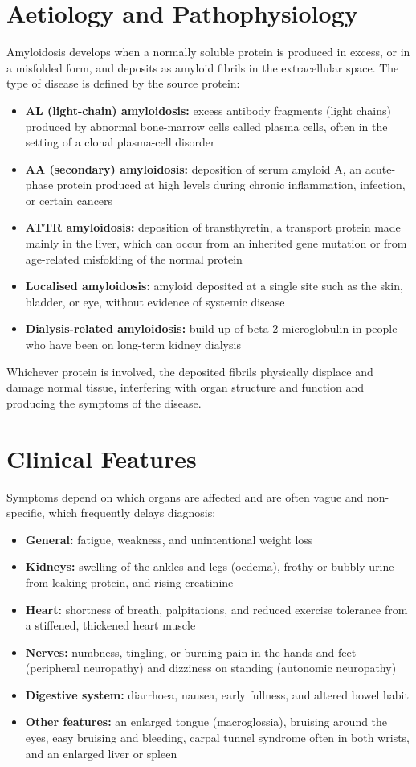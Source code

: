 \section*{Aetiology and Pathophysiology}
Amyloidosis develops when a normally soluble protein is produced in excess, or in a misfolded form, and deposits as amyloid fibrils in the extracellular space. The type of disease is defined by the source protein:
\begin{itemize}
    \item \textbf{AL (light-chain) amyloidosis:} excess antibody fragments (light chains) produced by abnormal bone-marrow cells called plasma cells, often in the setting of a clonal plasma-cell disorder
    \item \textbf{AA (secondary) amyloidosis:} deposition of serum amyloid A, an acute-phase protein produced at high levels during chronic inflammation, infection, or certain cancers
    \item \textbf{ATTR amyloidosis:} deposition of transthyretin, a transport protein made mainly in the liver, which can occur from an inherited gene mutation or from age-related misfolding of the normal protein
    \item \textbf{Localised amyloidosis:} amyloid deposited at a single site such as the skin, bladder, or eye, without evidence of systemic disease
    \item \textbf{Dialysis-related amyloidosis:} build-up of beta-2 microglobulin in people who have been on long-term kidney dialysis
\end{itemize}
Whichever protein is involved, the deposited fibrils physically displace and damage normal tissue, interfering with organ structure and function and producing the symptoms of the disease.

\section*{Clinical Features}
Symptoms depend on which organs are affected and are often vague and non-specific, which frequently delays diagnosis:
\begin{itemize}
    \item \textbf{General:} fatigue, weakness, and unintentional weight loss
    \item \textbf{Kidneys:} swelling of the ankles and legs (oedema), frothy or bubbly urine from leaking protein, and rising creatinine
    \item \textbf{Heart:} shortness of breath, palpitations, and reduced exercise tolerance from a stiffened, thickened heart muscle
    \item \textbf{Nerves:} numbness, tingling, or burning pain in the hands and feet (peripheral neuropathy) and dizziness on standing (autonomic neuropathy)
    \item \textbf{Digestive system:} diarrhoea, nausea, early fullness, and altered bowel habit
    \item \textbf{Other features:} an enlarged tongue (macroglossia), bruising around the eyes, easy bruising and bleeding, carpal tunnel syndrome often in both wrists, and an enlarged liver or spleen
\end{itemize}

